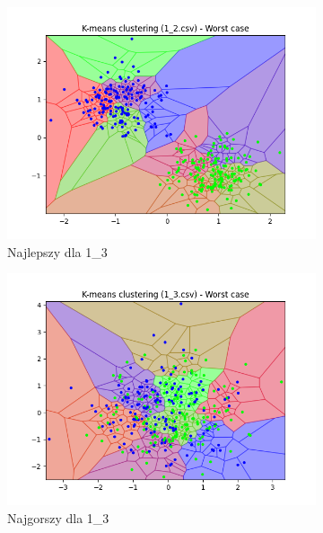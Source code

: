 \documentclass[12pt]{article}
\begin{document}
\begin{figure}[H]
\begin{subfigure}[b]{0.24\textwidth}
        \includegraphics[width=\linewidth]{img/exp_2/kmeans/1_2_worst.png}
        \caption{Najlepszy dla 1\_3}
    \end{subfigure}
    \hfill
    \begin{subfigure}[b]{0.24\textwidth}
        \includegraphics[width=\linewidth]{img/exp_2/kmeans/1_3_worst.png}
        \caption{Najgorszy dla 1\_3}
    \end{subfigure}
    \hfill
    \begin{subfigure}[b]{0.24\textwidth}

\end{subfigure}
\end{figure}
\end{document}
